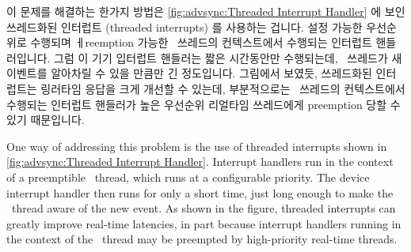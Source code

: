 이 문제를 해결하는 한가지 방법은 \cref{fig:advsync:Threaded Interrupt Handler}
에 보인 쓰레드화된 인터럽트 (threaded interrupts) 를 사용하는 겁니다.
설정 가능한 우선순위로 수행되며 ㅔreemption 가능한 \IRQ\ 쓰레드의 컨텍스트에서
수행되는 인터럽트 핸들러입니다.
그럼 이 기기 입터럽트 핸들러는 짧은 시간동안만 수행되는데, \IRQ\ 쓰레드가 새
이벤트를 알아차릴 수 있을 만큼만 긴 정도입니다.
그림에서 보였듯, 쓰레드화된 인터럽트는 링러타임 응답을 크게 개선할 수 있는데,
부분적으로는 \IRQ\ 쓰레드의 컨텍스트에서 수행되는 인터럽트 핸들러가 높은
우선순위 리얼타임 쓰레드에게 preemption 당할 수 있기 때문입니다.

\iffalse

One way of addressing this problem is the use of threaded interrupts shown in
\cref{fig:advsync:Threaded Interrupt Handler}.
Interrupt handlers run in the context of a preemptible \IRQ\ thread,
which runs at a configurable priority.
The device interrupt handler then runs for only a short time, just
long enough to make the \IRQ\ thread aware of the new event.
As shown in the figure, threaded interrupts can greatly improve
real-time latencies, in part because interrupt handlers running in
the context of the \IRQ\ thread may be preempted by high-priority real-time
threads.

